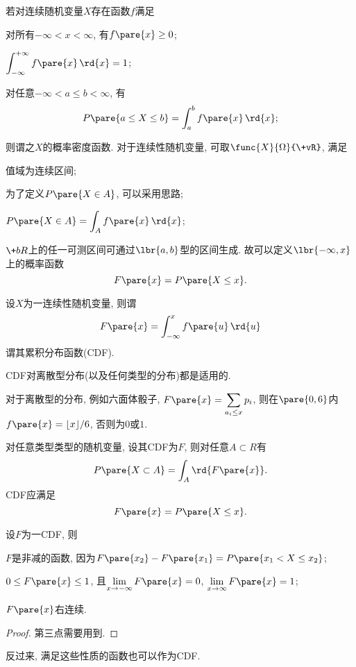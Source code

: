 \documentclass{ctexart}
\begin{document}
若对连续随机变量$X$存在函数$f$满足
\begin{cenum}
    \item 对所有$-\infty < x < \infty$, 有$f\pare{x}\ge 0$;
    \item $\displaystyle \int_{-\infty}^{+\infty}f\pare{x}\,\rd{x}  = 1$;
    \item 对任意$-\infty < a \le b < \infty$, 有
    \[ P\pare{a\le X \le b} = \int_a^b f\pare{x}\,\rd{x}; \]
\end{cenum}
则谓之$X$的概率密度函数. 对于连续性随机变量, 可取$\func{X}{\Omega}{\+vR}$, 满足
\begin{cenum}
    \item 值域为连续区间;
    \item 为了定义$P\pare{X\in A}$, 可以采用思路;
    \begin{cenum}
        \item $P\pare{X\in A} = \displaystyle \int_A f\pare{x}\,\rd{x}$;
        \item $\+bR$上的任一可测区间可通过$\lbr{a,b}$型的区间生成. 故可以定义$\lbr{-\infty, x}$上的概率函数
\[ F\pare{x} = P\pare{X \le x}. \]
    \end{cenum}
\end{cenum}
设$X$为一连续性随机变量, 则谓
\[ F\pare{x} = \int_{-\infty}^x f\pare{u}\,\rd{u} \]
谓其累积分布函数(CDF).
\begin{remark}
    CDF对离散型分布(以及任何类型的分布)都是适用的.
\end{remark}
\begin{sample}
    \begin{ex}
        对于离散型的分布, 例如六面体骰子, $F\pare{x} = \displaystyle \sum_{a_i \le x} p_i$, 则在$\pare{0,6}$内$f\pare{x} = \lfloor{x}\rfloor{}/6$, 否则为$0$或$1$.
    \end{ex}
\end{sample}
对任意类型类型的随机变量, 设其CDF为$F$, 则对任意$A\subset R$有
\[ P\pare{X\subset A} = \int_A \rd{F\pare{x}}. \]
CDF应满足
\[ F\pare{x} = P\pare{X\le x}. \]
\begin{lemma}[CDF的性质]
    设$F$为一CDF, 则
    \begin{cenum}
        \item $F$是非减的函数, 因为$F\pare{x_2} - F\pare{x_1} = P\pare{x_1 < X \le x_2}$;
        \item $0\le F\pare{x} \le 1$, 且$\displaystyle \lim_{x\rightarrow -\infty} F\pare{x} = 0$, $\displaystyle \lim_{x\rightarrow\infty} F\pare{x} = 1$;
        \item {\color{red}$F\pare{x}$右连续.}
    \end{cenum}    
\end{lemma}
\begin{proof}
    第三点需要用到.
\end{proof}
反过来, 满足这些性质的函数也可以作为CDF.
\end{document}
